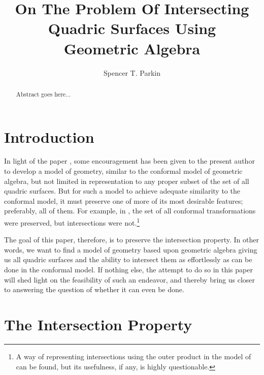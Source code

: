 \documentclass{birkjour}
\theoremstyle{definition}
\theoremstyle{remark}
\numberwithin{equation}{section}
\begin{document}
\title{On The Problem Of Intersecting\\Quadric Surfaces Using\\Geometric Algebra}

\author{Spencer T. Parkin}
\address{102 W. 500 S., \\
Salt Lake City, UT  84101} 



\begin{abstract}
Abstract goes here...
\end{abstract}


\maketitle

\section{Introduction}

In light of the paper \cite{}, some encouragement has been given to the present
author to develop a model of geometry, similar to the conformal model of geometric
algebra, but not limited in representation to any proper subset of the set of all
quadric surfaces.  But for such a model to achieve adequate similarity to the conformal model,
it must preserve one of more of its most desirable features; preferably, all of them.
For example, in \cite{}, the set of all conformal transformations were preserved, but
intersections were not.\footnote{A way of representing intersections using the outer
product in the model of \cite{} can be found, but its usefulness, if any, is highly questionable.}

The goal of this paper, therefore, is to
preserve the intersection property.  In other words, we want to find a model of geometry based upon
geometric algebra giving us all quadric surfaces and the ability to intersect them
as effortlessly as can be done in the conformal model.  If nothing else, the attempt
to do so in this paper will shed light on the feasibility of such an endeavor, and thereby
bring us closer to answering the question of whether it can even be done.

\section{The Intersection Property}
\end{document}
